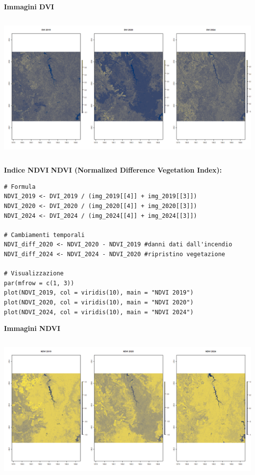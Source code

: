 \documentclass{beamer}
\begin{document}
\begin{frame}{\textbf{Immagini DVI}}
\begin{columns}
    \centering
    \includegraphics[width=\textwidth]{DVI.png}
\end{columns}
\end{frame}

\begin{frame}[fragile]{\textbf{Indice NDVI}}
\textbf{NDVI (Normalized Difference Vegetation Index):}
\begin{lstlisting}
# Formula
NDVI_2019 <- DVI_2019 / (img_2019[[4]] + img_2019[[3]])
NDVI_2020 <- DVI_2020 / (img_2020[[4]] + img_2020[[3]])
NDVI_2024 <- DVI_2024 / (img_2024[[4]] + img_2024[[3]])

# Cambiamenti temporali
NDVI_diff_2020 <- NDVI_2020 - NDVI_2019 #danni dati dall'incendio
NDVI_diff_2024 <- NDVI_2024 - NDVI_2020 #ripristino vegetazione

# Visualizzazione
par(mfrow = c(1, 3))
plot(NDVI_2019, col = viridis(10), main = "NDVI 2019")
plot(NDVI_2020, col = viridis(10), main = "NDVI 2020")
plot(NDVI_2024, col = viridis(10), main = "NDVI 2024")
\end{lstlisting}
\end{frame}

\begin{frame}{\textbf{Immagini NDVI}}
\begin{columns}
    \centering
    \includegraphics[width=\textwidth]{NDVI.png}
\end{columns}
\end{frame}
\end{document}
